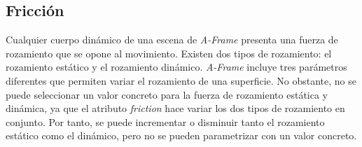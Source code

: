 \begin{table}[]
\centering
\caption{Resultados de las colisiones obtenidos con el escenario 3}
\label{fig:col-escenario3}
\end{table}

 
\subsection{Fricción}
Cualquier cuerpo dinámico de una escena de \textit{A-Frame} presenta una fuerza de rozamiento que se opone al movimiento. Existen dos tipos de rozamiento: el rozamiento estático y el rozamiento dinámico. \textit{A-Frame} incluye tres parámetros diferentes que permiten variar el rozamiento de una superficie. No obstante, no se puede seleccionar un valor concreto para la fuerza de rozamiento estática y dinámica, ya que el atributo \textit{friction} hace variar los dos tipos de rozamiento en conjunto. Por tanto, se puede incrementar o disminuir tanto el rozamiento estático como el dinámico, pero no se pueden parametrizar con un valor concreto. \newline

